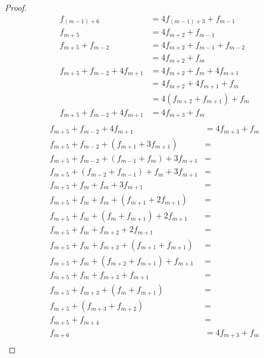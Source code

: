 \documentclass[12pt,letterpaper]{article}
\begin{document}
\begin{enumerate}
\begin{enumerate}
\begin{enumerate}
\begin{proof}
                \begin{align*}
                  f_{\left(m - 1\right) + 6} &= 4f_{\left(m - 1\right) + 3} + f_{m - 1} \\
                  f_{m + 5} &= 4f_{m + 2} + f_{m - 1} \\
                  f_{m + 5} + f_{m - 2} &= 4f_{m + 2} + f_{m - 1} + f_{m - 2} \\
                  &= 4f_{m + 2} + f_m \\
                  f_{m + 5} + f_{m - 2} + 4f_{m + 1} &= 4f_{m + 2} + f_m + 4f_{m + 1} \\
                  &= 4f_{m + 2} + 4f_{m + 1} + f_m \\
                  &= 4\left(f_{m + 2} + f_{m + 1}\right) + f_m \\
                  f_{m + 5} + f_{m - 2} + 4f_{m + 1} &= 4f_{m + 3} + f_m \\
                \end{align*}
                \begin{align*}
                  f_{m + 5} + f_{m - 2} + 4f_{m + 1}                                &= 4f_{m + 3} + f_m \\
                  f_{m + 5} + f_{m - 2} + \left(f_{m + 1} + 3f_{m + 1}\right)       &= \\
                  f_{m + 5} + f_{m - 2} + \left(f_{m - 1} + f_m\right) + 3f_{m + 1} &= \\
                  f_{m + 5} + \left(f_{m - 2} + f_{m - 1}\right) + f_m + 3f_{m + 1} &= \\
                  f_{m + 5} + f_m + f_m + 3f_{m + 1}                                &= \\
                  f_{m + 5} + f_m + f_m + \left(f_{m + 1} + 2f_{m + 1}\right)       &= \\
                  f_{m + 5} + f_m + \left(f_m + f_{m + 1}\right) + 2f_{m + 1}       &= \\
                  f_{m + 5} + f_m + f_{m + 2} + 2f_{m + 1}                          &= \\
                  f_{m + 5} + f_m + f_{m + 2} + \left(f_{m + 1} + f_{m + 1}\right)  &= \\
                  f_{m + 5} + f_m + \left(f_{m + 2} + f_{m + 1}\right) + f_{m + 1}  &= \\
                  f_{m + 5} + f_m + f_{m + 3} + f_{m + 1}                           &= \\
                  f_{m + 5} + f_{m + 3} + \left(f_m + f_{m + 1}\right)              &= \\
                  f_{m + 5} + \left(f_{m + 3} + f_{m + 2}\right)                    &= \\
                  f_{m + 5} + f_{m + 4}                                             &= \\
                  f_{m + 6}                                                         &= 4f_{m + 3} + f_m \\
                \end{align*}


\end{proof}
\end{enumerate}
\end{enumerate}
\end{enumerate}
\end{document}
